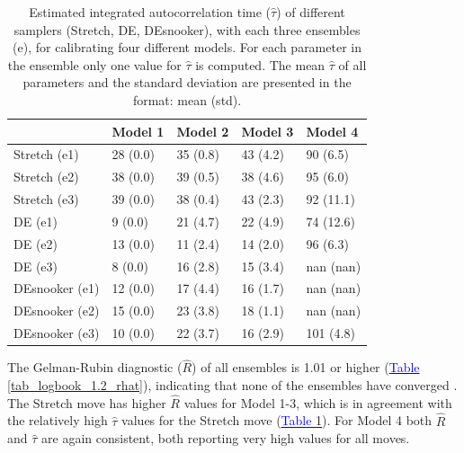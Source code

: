 \begin{table}[ht]
\caption{Estimated integrated autocorrelation time ($\hat{\tau}$) of different samplers (Stretch, DE, DEsnooker), with each three ensembles (e), for calibrating four different models. For each parameter in the ensemble only one value for $\hat{\tau}$ is computed. The mean $\hat{\tau}$ of all parameters and the standard deviation are presented in the format: mean (std).}
\label{tab_logbook_1.2_tau}
\begin{tabularx}{\textwidth}{XXXXX}
\toprule
 & Model 1 & Model 2 & Model 3 & Model 4 \\
\midrule
Stretch (e1) & 28 (0.0) & 35 (0.8) & 43 (4.2) & 90 (6.5) \\
Stretch (e2) & 38 (0.0) & 39 (0.5) & 38 (4.6) & 95 (6.0) \\
Stretch (e3) & 39 (0.0) & 38 (0.4) & 43 (2.3) & 92 (11.1) \\
\midrule
DE (e1) & \phantom{0}9 (0.0) & 21 (4.7) & 22 (4.9) & 74 (12.6) \\
DE (e2) & 13 (0.0) & 11 (2.4) & 14 (2.0) & 96 (6.3) \\
DE (e3) & \phantom{0}8 (0.0) & 16 (2.8) & 15 (3.4) & nan (nan) \\
\midrule
DEsnooker (e1) & 12 (0.0) & 17 (4.4) & 16 (1.7) & nan (nan) \\
DEsnooker (e2) & 15 (0.0) & 23 (3.8) & 18 (1.1) & nan (nan) \\
DEsnooker (e3) & 10 (0.0) & 22 (3.7) & 16 (2.9) & 101 (4.8) \\
\bottomrule
\end{tabularx}
\end{table}

The Gelman-Rubin diagnostic ($\hat{R}$) of all ensembles is 1.01 or higher (\hyperref[tab_logbook_1.2_rhat]{\textcolor{blue}{Table }\ref{tab_logbook_1.2_rhat}}), indicating that none of the ensembles have converged \cite{vehtari2021rank}. The Stretch move has higher $\hat{R}$ values for Model 1-3, which is in agreement with the relatively high $\hat{\tau}$ values for the Stretch move (\hyperref[tab_logbook_1.2_tau]{\textcolor{blue}{Table }\ref{tab_logbook_1.2_tau}}). For Model 4 both $\hat{R}$ and $\hat{\tau}$ are again consistent, both reporting very high values for all moves. 

